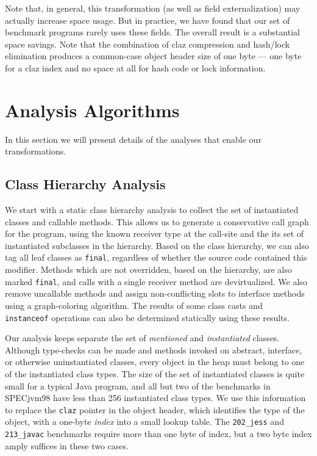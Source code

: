 \documentclass[oribibl]{llncs}
\begin{document}
Note that, in general, this transformation (as well as field
externalization) may actually increase space usage. But in
practice, we have found that our set of benchmark programs
rarely uses these fields. The overall result is a substantial
space savings. Note that the combination of claz compression 
and hash/lock elimination produces a common-case object header
size of one byte --- one byte for a claz index and no
space at all for hash code or lock information. 
%
\section{Analysis Algorithms}
%
In this section we will present details of the analyses that enable
our transformations.
%
\subsection{Class Hierarchy Analysis}
We start with a static class hierarchy analysis to collect the set of
instantiated classes and callable methods.  This allows us to generate
a conservative call graph for the program, using the known receiver
type at the call-site and the its set of instantiated subclasses in the
hierarchy.  Based on the class hierarchy, we can also tag all leaf
classes as {\tt final}, regardless of whether the source code contained
this modifier.  Methods which are not overridden, based on
the hierarchy, are also marked {\tt final}, and calls with a single
receiver method are devirtualized.  We also remove uncallable methods
and assign non-conflicting slots to interface methods using a
graph-coloring algorithm.  The results of some class casts and {\tt
  instanceof} operations can also be determined statically using
these results.

Our analysis keeps separate the set of {\it mentioned} and
{\it instantiated} classes.  Although type-checks can be made and methods
invoked on abstract, interface, or otherwise uninstantiated classes,
every object
in the heap must belong to one of the instantiated class types.
The size of the set of instantiated classes is quite small for a
typical Java program, and all but two of the benchmarks in SPECjvm98
have less than 256 instantiated class types.  We use this information
to replace the {\tt claz} pointer in the object header, which
identifies the type of the object, with a one-byte {\it index} into a
small lookup table.  The {\tt 202\_jess} and {\tt 213\_javac}
benchmarks require more than one byte of index, but a two byte index
amply suffices in these two cases.
\end{document}
